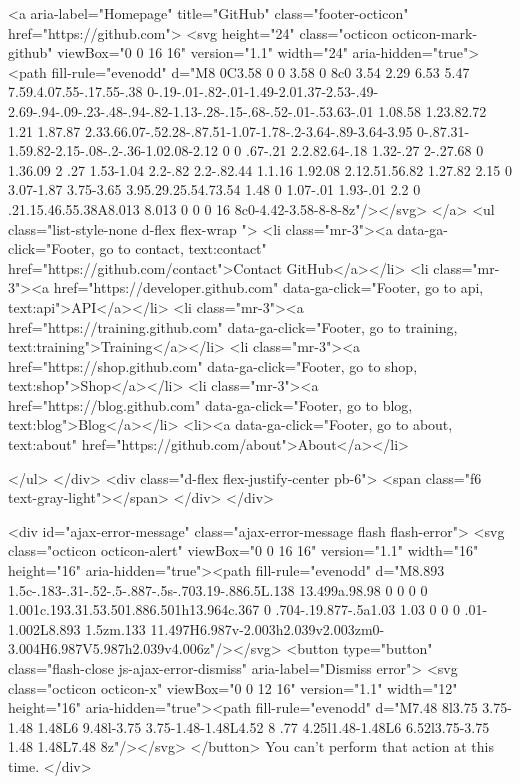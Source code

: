     <a aria-label="Homepage" title="GitHub" class="footer-octicon" href="https://github.com">
      <svg height="24" class="octicon octicon-mark-github" viewBox="0 0 16 16" version="1.1" width="24" aria-hidden="true"><path fill-rule="evenodd" d="M8 0C3.58 0 0 3.58 0 8c0 3.54 2.29 6.53 5.47 7.59.4.07.55-.17.55-.38 0-.19-.01-.82-.01-1.49-2.01.37-2.53-.49-2.69-.94-.09-.23-.48-.94-.82-1.13-.28-.15-.68-.52-.01-.53.63-.01 1.08.58 1.23.82.72 1.21 1.87.87 2.33.66.07-.52.28-.87.51-1.07-1.78-.2-3.64-.89-3.64-3.95 0-.87.31-1.59.82-2.15-.08-.2-.36-1.02.08-2.12 0 0 .67-.21 2.2.82.64-.18 1.32-.27 2-.27.68 0 1.36.09 2 .27 1.53-1.04 2.2-.82 2.2-.82.44 1.1.16 1.92.08 2.12.51.56.82 1.27.82 2.15 0 3.07-1.87 3.75-3.65 3.95.29.25.54.73.54 1.48 0 1.07-.01 1.93-.01 2.2 0 .21.15.46.55.38A8.013 8.013 0 0 0 16 8c0-4.42-3.58-8-8-8z"/></svg>
</a>
   <ul class="list-style-none d-flex flex-wrap ">
        <li class="mr-3"><a data-ga-click="Footer, go to contact, text:contact" href="https://github.com/contact">Contact GitHub</a></li>
      <li class="mr-3"><a href="https://developer.github.com" data-ga-click="Footer, go to api, text:api">API</a></li>
      <li class="mr-3"><a href="https://training.github.com" data-ga-click="Footer, go to training, text:training">Training</a></li>
      <li class="mr-3"><a href="https://shop.github.com" data-ga-click="Footer, go to shop, text:shop">Shop</a></li>
        <li class="mr-3"><a href="https://blog.github.com" data-ga-click="Footer, go to blog, text:blog">Blog</a></li>
        <li><a data-ga-click="Footer, go to about, text:about" href="https://github.com/about">About</a></li>

    </ul>
  </div>
  <div class="d-flex flex-justify-center pb-6">
    <span class="f6 text-gray-light"></span>
  </div>
</div>



  <div id="ajax-error-message" class="ajax-error-message flash flash-error">
    <svg class="octicon octicon-alert" viewBox="0 0 16 16" version="1.1" width="16" height="16" aria-hidden="true"><path fill-rule="evenodd" d="M8.893 1.5c-.183-.31-.52-.5-.887-.5s-.703.19-.886.5L.138 13.499a.98.98 0 0 0 0 1.001c.193.31.53.501.886.501h13.964c.367 0 .704-.19.877-.5a1.03 1.03 0 0 0 .01-1.002L8.893 1.5zm.133 11.497H6.987v-2.003h2.039v2.003zm0-3.004H6.987V5.987h2.039v4.006z"/></svg>
    <button type="button" class="flash-close js-ajax-error-dismiss" aria-label="Dismiss error">
      <svg class="octicon octicon-x" viewBox="0 0 12 16" version="1.1" width="12" height="16" aria-hidden="true"><path fill-rule="evenodd" d="M7.48 8l3.75 3.75-1.48 1.48L6 9.48l-3.75 3.75-1.48-1.48L4.52 8 .77 4.25l1.48-1.48L6 6.52l3.75-3.75 1.48 1.48L7.48 8z"/></svg>
    </button>
    You can’t perform that action at this time.
  </div>


